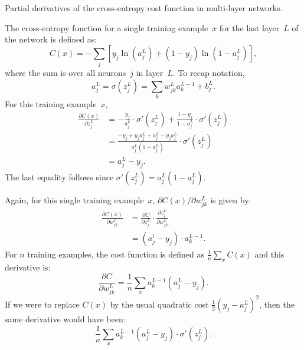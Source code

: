 \begin{exercise}
Partial derivatives of the cross-entropy cost function in multi-layer
networks.
\end{exercise}
\begin{solution}
The cross-entropy function for a single training example~$x$ for the last
layer~$L$ of the network is defined as:
\[
    C(x) = - \sum_j \left [ y_j \ln (a_j^L) + (1 - y_j) \ln(1 - a_j^L) \right ],
\]
where the sum is over all neurons~$j$ in layer~$L$. To recap notation,  
\[
a_j^L = \sigma(z_j^L) = \sum_k w_{j k}^L a_k^{L - 1} + b_j^L.
\]
For this training example~$x$,
\begin{align*}
    \frac{\partial C(x)}{\partial z_j^L} 
        & = - \frac{y_j}{a_j^L} \cdot \sigma' (z_j^L) + \frac{1 - y_j}{1 - a_j^L} \cdot \sigma' (z_j^L) \\
        & = \frac{-y_j + y_j a_j^L + a_j^L - y_j a_j^L}{a_j^L (1 - a_j^L)} \cdot \sigma' (z_j^L) \\
        & = a_j^L - y_j.
\end{align*}
The last equality follows since $\sigma' (z_j^L) = a_j^L (1 - a_j^L)$.

Again, for this single training example~$x$, $\partial C (x) / \partial w_{j k}^L$ 
is given by:
\begin{align*}
    \frac{\partial C (x)}{\partial w_{j k}^L} 
        & = \frac{\partial C}{\partial z_j^L} \cdot \frac{\partial z_j^L}{\partial w_{j k}^L} \\
        & = (a_j^l - y_j) \cdot a_k^{L - 1}. 
\end{align*}
For $n$ training examples, the cost function is defined as $\frac{1}{n} \sum_{x} C(x)$ and 
this derivative is: 
\[
    \frac{\partial C}{\partial w_{j k}^L} = \frac{1}{n} \sum_x a_k^{L - 1} (a_j^L - y_j).
\]
If we were to replace $C(x)$ by the usual quadratic cost $\frac{1}{2}(y_j - a_j^L)^2$, then 
the same derivative would have been:
\[
    \frac{1}{n} \sum_x a_k^{L - 1} (a_j^L - y_j) \cdot \sigma' (z_j^L).
\]
\end{solution}
